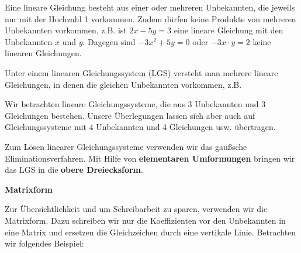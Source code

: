 Eine lineare Gleichung besteht aus einer oder mehreren Unbekannten, die jeweils nur mit der Hochzahl 1 vorkommen. Zudem dürfen keine Produkte von mehreren Unbekannten vorkommen, z.B. ist \mbox{\(2x-5y=3\)} eine lineare Gleichung mit den Unbekannten \(x\) und \(y\). Dagegen sind \mbox{\(-3x^2+5y=0\)} oder \mbox{\(-3x\cdot y=2\)} keine linearen Gleichungen.

Unter einem linearen Gleichungssystem (LGS) versteht man mehrere lineare Gleichungen, in denen die gleichen Unbekannten vorkommen, z.B.

\bigskip

\begin{minipage}{\textwidth}
\end{minipage}

\bigskip

Wir betrachten lineare Gleichungssysteme, die aus 3 Unbekannten und 3 Gleichungen bestehen. Unsere Überlegungen lassen sich aber auch auf Gleichungssysteme mit 4 Unbekannten und 4 Gleichungen usw. übertragen.

Zum Lösen linearer Gleichungssysteme verwenden wir das gaußsche Eliminationsverfahren. Mit Hilfe von \textbf{elementaren Umformungen} bringen wir das LGS in die \textbf{obere Dreiecksform}.

\bigskip

\textbf{Matrixform}

Zur Übersichtlichkeit und um Schreibarbeit zu sparen, verwenden wir die Matrixform. Dazu schreiben wir nur die Koeffizienten vor den Unbekannten in eine Matrix und ersetzen die Gleichzeichen durch eine vertikale Linie. Betrachten wir folgendes Beispiel:

